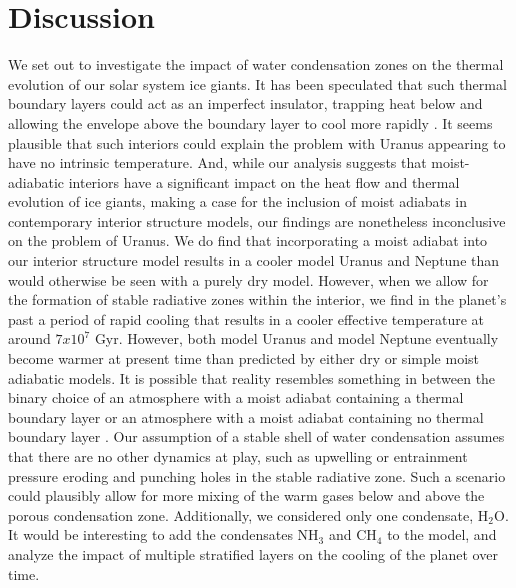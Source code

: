 \documentclass[11pt]{ucscthesisbs}
\begin{document}
\chapter{Discussion}
We set out to investigate the impact of water condensation zones on the thermal evolution of our solar system ice giants. It has been speculated that such thermal boundary layers could act as an imperfect insulator, trapping heat below and allowing the envelope above the boundary layer to cool more rapidly \citep{nettelmann_2016,friedson_2017,leconte_2017,podolak_1991,scheibe_2019}. It seems plausible that such interiors could explain the problem with Uranus appearing to have no intrinsic temperature. And, while our analysis suggests that moist-adiabatic interiors have a significant impact on the heat flow and thermal evolution of ice giants, making a case for the inclusion of moist adiabats in contemporary interior structure models, our findings are nonetheless inconclusive on the problem of Uranus. We do find that incorporating a moist adiabat into our interior structure model results in a cooler model Uranus and Neptune than would otherwise be seen with a purely dry model. However, when we allow for the formation of stable radiative zones within the interior, we find in the planet's past a period of rapid cooling that results in a cooler effective temperature at around $7 x 10^7$ Gyr. However, both model Uranus and model Neptune eventually become warmer at present time than predicted by either dry or simple moist adiabatic models. It is possible that reality resembles something in between the binary choice of an atmosphere with a moist adiabat containing a thermal boundary layer or an atmosphere with a moist adiabat containing no thermal boundary layer \citep{guillot_2019}. Our assumption of a stable shell of water condensation assumes that there are no other dynamics at play, such as upwelling or entrainment pressure \citep{friedson_2017,2019arXiv190802092G} eroding and punching holes in the stable radiative zone. Such a scenario could plausibly allow for more mixing of the warm gases below and above the porous condensation zone. Additionally, we considered only one condensate, H$_{2}$O. It would be interesting to add the condensates NH$_{3}$ and CH$_{4}$ to the model, and analyze the impact of multiple stratified layers on the cooling of the planet over time. 



\newcommand{\newblock}{}

\end{document}
